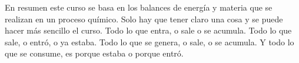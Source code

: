 \documentclass[
	spanish, %
	letterpaper, oneside
]{article}
\begin{document}
	
\templatePortrait

\templatePagecfg

\begin{abstractd}
	En resumen este curso se basa en los balances de energía y materia que se realizan en un proceso químico.
	Solo hay que tener claro una cosa y se puede hacer más sencillo el curso. Todo lo que entra, o sale o se acumula. Todo lo que sale, o entró, o ya estaba. 
	Todo lo que se genera, o sale, o se acumula. Y todo lo que se consume, es porque estaba o porque entró.
\end{abstractd}
\clearpage
\tableofcontents

\templateFinalcfg



\end{document}
